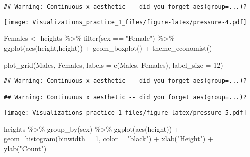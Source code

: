 \documentclass[
]{article}
\newenvironment{Shaded}{\begin{snugshade}}{\end{snugshade}}
\newcommand{\AttributeTok}[1]{\textcolor[rgb]{0.77,0.63,0.00}{#1}}
\newcommand{\DecValTok}[1]{\textcolor[rgb]{0.00,0.00,0.81}{#1}}
\newcommand{\FunctionTok}[1]{\textcolor[rgb]{0.00,0.00,0.00}{#1}}
\newcommand{\NormalTok}[1]{#1}
\newcommand{\OtherTok}[1]{\textcolor[rgb]{0.56,0.35,0.01}{#1}}
\newcommand{\SpecialCharTok}[1]{\textcolor[rgb]{0.00,0.00,0.00}{#1}}
\newcommand{\StringTok}[1]{\textcolor[rgb]{0.31,0.60,0.02}{#1}}
\begin{document}
\begin{verbatim}
## Warning: Continuous x aesthetic -- did you forget aes(group=...)?
\end{verbatim}

\texttt{[image: Visualizations\_practice\_1\_files/figure-latex/pressure-4.pdf]}

\begin{Shaded}
\begin{Highlighting}[]
\NormalTok{Females }\OtherTok{\textless{}{-}} 
\NormalTok{  heights }\SpecialCharTok{\%\textgreater{}\%} 
      \FunctionTok{filter}\NormalTok{(sex }\SpecialCharTok{==} \StringTok{"Female"}\NormalTok{) }\SpecialCharTok{\%\textgreater{}\%} \FunctionTok{ggplot}\NormalTok{(}\FunctionTok{aes}\NormalTok{(height,height)) }\SpecialCharTok{+} 
      \FunctionTok{geom\_boxplot}\NormalTok{() }\SpecialCharTok{+} \FunctionTok{theme\_economist}\NormalTok{()}


\FunctionTok{plot\_grid}\NormalTok{(Males, Females, }\AttributeTok{labels =} \FunctionTok{c}\NormalTok{(}\StringTok{\textquotesingle{}Males\textquotesingle{}}\NormalTok{, }\StringTok{\textquotesingle{}Females\textquotesingle{}}\NormalTok{), }\AttributeTok{label\_size =} \DecValTok{12}\NormalTok{)}
\end{Highlighting}
\end{Shaded}

\begin{verbatim}
## Warning: Continuous x aesthetic -- did you forget aes(group=...)?

## Warning: Continuous x aesthetic -- did you forget aes(group=...)?
\end{verbatim}

\texttt{[image: Visualizations\_practice\_1\_files/figure-latex/pressure-5.pdf]}

\begin{Shaded}
\begin{Highlighting}[]
\NormalTok{heights }\SpecialCharTok{\%\textgreater{}\%} 
  \FunctionTok{group\_by}\NormalTok{(sex) }\SpecialCharTok{\%\textgreater{}\%} \FunctionTok{ggplot}\NormalTok{(}\FunctionTok{aes}\NormalTok{(height)) }\SpecialCharTok{+} 
  \FunctionTok{geom\_histogram}\NormalTok{(}\AttributeTok{binwidth =} \DecValTok{1}\NormalTok{, }\AttributeTok{color =} \StringTok{"black"}\NormalTok{) }\SpecialCharTok{+} 
  \FunctionTok{xlab}\NormalTok{(}\StringTok{"Height"}\NormalTok{) }\SpecialCharTok{+} \FunctionTok{ylab}\NormalTok{(}\StringTok{"Count"}\NormalTok{)}
\end{Highlighting}
\end{Shaded}
\end{document}
